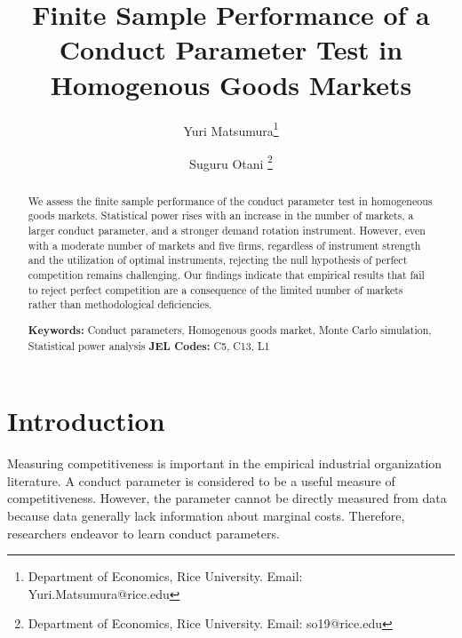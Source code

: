 \documentclass[11pt, a4paper]{article}
\title{Finite Sample Performance of a Conduct Parameter Test in Homogenous Goods Markets}
\author{Yuri Matsumura\thanks{Department of Economics, Rice University. Email: Yuri.Matsumura@rice.edu} \and Suguru Otani \thanks{Department of Economics, Rice University. Email: so19@rice.edu
}}
\begin{document}
\maketitle
\begin{abstract}
    We assess the finite sample performance of the conduct parameter test in homogeneous goods markets. Statistical power rises with an increase in the number of markets, a larger conduct parameter, and a stronger demand rotation instrument. However, even with a moderate number of markets and five firms, regardless of instrument strength and the utilization of optimal instruments, rejecting the null hypothesis of perfect competition remains challenging. Our findings indicate that empirical results that fail to reject perfect competition are a consequence of the limited number of markets rather than methodological deficiencies.
\vspace{0.1in}

\noindent\textbf{Keywords:} Conduct parameters, Homogenous goods market, Monte Carlo simulation, Statistical power analysis
\vspace{0in}
\newline
\noindent\textbf{JEL Codes:} C5, C13, L1

\bigskip
\end{abstract}


\section{Introduction}
Measuring competitiveness is important in the empirical industrial organization literature.
A conduct parameter is considered to be a useful measure of competitiveness. 
However, the parameter cannot be directly measured from data because data generally lack information about marginal costs.
Therefore, researchers endeavor to learn conduct parameters.
\end{document}
